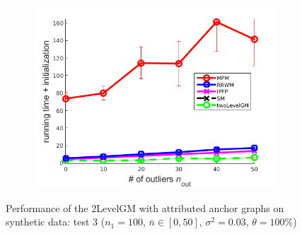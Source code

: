 \begin{figure}[h]
\begin{subfigure}[b]{0.33\textwidth}
			\includegraphics[scale=0.25]{"chapter3/fig/SyntheticTest/descr/Results_v4.3.3/Test1/time_summary_avg10t"} 
		\end{subfigure} 	
	\caption[Performance of the 2LevelGM with attributed anchor graphs on synthetic data (test $3$)]{Performance of the 2LevelGM with attributed anchor graphs on synthetic data: test $3$ ($n_1=100$, $\bar{n}\in[0,50]$, $\sigma^2=0.03$, $\theta=100\%$)}
	\label{fig:synTest3_descr_ver433}
\end{figure}
